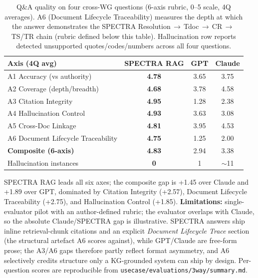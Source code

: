 \begin{table}[h]
\centering
\scriptsize
\setlength{\tabcolsep}{6pt}
\caption{Q\&A quality on four cross-WG questions (6-axis rubric, 0--5 scale, 4Q averages). A6 (Document Lifecycle Traceability) measures the depth at which the answer demonstrates the SPECTRA Resolution\,$\to$\,Tdoc\,$\to$\,CR\,$\to$\,TS/TR chain (rubric defined below this table). Hallucination row reports detected unsupported quotes/codes/numbers across all four questions.}
\label{tab:llm-eval}
\begin{tabular}{@{}lccc@{}}
\toprule
\textbf{Axis (4Q avg)} & \textbf{SPECTRA RAG} & \textbf{GPT} & \textbf{Claude} \\
\midrule
A1 Accuracy (vs authority)         & \textbf{4.78} & 3.65 & 3.75 \\
A2 Coverage (depth/breadth)        & \textbf{4.68} & 3.78 & 4.58 \\
A3 Citation Integrity              & \textbf{4.95} & 1.28 & 2.38 \\
A4 Hallucination Control           & \textbf{4.93} & 3.63 & 3.08 \\
A5 Cross-Doc Linkage               & \textbf{4.81} & 3.95 & 4.53 \\
A6 Document Lifecycle Traceability & \textbf{4.75} & 1.25 & 2.00 \\
\midrule
\textbf{Composite (6-axis)}        & \textbf{4.83} & 2.94 & 3.38 \\
\midrule
Hallucination instances    & \textbf{0}    & 1    & $\sim$11 \\
\bottomrule
\end{tabular}
\end{table}

SPECTRA RAG leads all six axes; the composite gap is +1.45 over Claude and +1.89 over GPT, dominated by Citation Integrity (+2.57), Document Lifecycle Traceability (+2.75), and Hallucination Control (+1.85). \textbf{Limitations:} single-evaluator pilot with an author-defined rubric; the evaluator overlaps with Claude, so the absolute Claude/SPECTRA gap is illustrative. SPECTRA answers ship inline retrieval-chunk citations and an explicit \emph{Document Lifecycle Trace} section (the structural artefact A6 scores against), while GPT/Claude are free-form prose; the A3/A6 gaps therefore partly reflect format asymmetry, and A6 selectively credits structure only a KG-grounded system can ship by design. Per-question scores are reproducible from \texttt{usecase/\bk evaluations/3way/\bk summary.md}.


